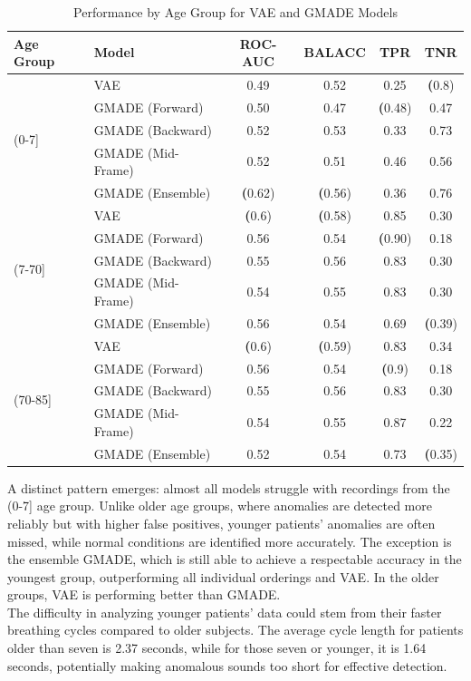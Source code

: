 \begin{table}[h!]
    \centering
    \caption{Performance by Age Group for VAE and GMADE Models}
    \begin{tabular}{|l|l|c|c|c|c|}
    \hline
    \textbf{Age Group} & \textbf{Model} & \textbf{ROC-AUC} & \textbf{BALACC} & \textbf{TPR} & \textbf{TNR} \\
    \hline
    \multirow{5}{*}{(0-7]} 
    & VAE & 0.49 & 0.52 & 0.25 & \textbf(0.8) \\
    & GMADE (Forward) & 0.50 & 0.47 & \textbf(0.48) & 0.47 \\
    & GMADE (Backward) & 0.52 & 0.53 & 0.33 & 0.73 \\
    & GMADE (Mid-Frame) & 0.52 & 0.51 & 0.46 & 0.56 \\
    & GMADE (Ensemble) & \textbf(0.62) & \textbf(0.56) & 0.36 & 0.76 \\
    \hline
    \multirow{5}{*}{(7-70]} 
    & VAE & \textbf(0.6) & \textbf(0.58) & 0.85 & 0.30 \\
    & GMADE (Forward) & 0.56 & 0.54 & \textbf(0.90) & 0.18 \\
    & GMADE (Backward) & 0.55 & 0.56 & 0.83 & 0.30 \\
    & GMADE (Mid-Frame) & 0.54 & 0.55 & 0.83 & 0.30 \\
    & GMADE (Ensemble) & 0.56 & 0.54 & 0.69 & \textbf(0.39) \\
    \hline
    \multirow{5}{*}{(70-85]} 
    & VAE & \textbf(0.6) & \textbf(0.59) & 0.83 & 0.34 \\
    & GMADE (Forward) & 0.56 & 0.54 & \textbf(0.9) & 0.18 \\
    & GMADE (Backward) & 0.55 & 0.56 & 0.83 & 0.30 \\
    & GMADE (Mid-Frame) & 0.54 & 0.55 & 0.87 & 0.22 \\
    & GMADE (Ensemble) & 0.52 & 0.54 & 0.73 & \textbf(0.35) \\
    \hline
    \end{tabular}
\end{table}

A distinct pattern emerges: almost all models struggle with recordings from the (0-7] age group. Unlike older age groups, where anomalies are detected more reliably but with higher false positives, younger patients' anomalies are often missed, while normal conditions are identified more accurately. The exception is the ensemble GMADE, which is still able to achieve a respectable accuracy in the youngest group, outperforming all individual orderings and VAE. In the older groups, VAE is performing better than GMADE.\\
The difficulty in analyzing younger patients' data could stem from their faster breathing cycles compared to older subjects. The average cycle length for patients older than seven is 2.37 seconds, while for those seven or younger, it is 1.64 seconds, potentially making anomalous sounds too short for effective detection.

